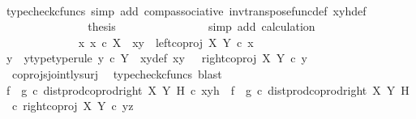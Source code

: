 \begin{isabellebody}
\ \ \ \ \ \ \ \ \ \ \ \ \ \ \isamarkupfalse%
\ {\isacharparenleft}{\kern0pt}typecheck{\isacharunderscore}{\kern0pt}cfuncs{\isacharcomma}{\kern0pt}\ simp\ add{\isacharcolon}{\kern0pt}\ comp{\isacharunderscore}{\kern0pt}associative{}\ inv{\isacharunderscore}{\kern0pt}transpose{\isacharunderscore}{\kern0pt}func{\isacharunderscore}{\kern0pt}def{}\ xyh{\isacharunderscore}{\kern0pt}def{\isacharparenright}{\kern0pt}\isanewline
\ \ \ \ \ \ \ \ \ \ \ \ \isamarkupfalse%
\ \isamarkupfalse%
\ {\isacharquery}{\kern0pt}thesis\isanewline
\ \ \ \ \ \ \ \ \ \ \ \ \ \ \isamarkupfalse%
\ {\isacharparenleft}{\kern0pt}simp\ add{\isacharcolon}{\kern0pt}\ calculation{\isacharparenright}{\kern0pt}\isanewline
\ \ \ \ \ \ \ \ \ \ \isamarkupfalse%
\isanewline
\ \ \ \ \ \ \ \ \ \ \ \ \isamarkupfalse%
\ {\isachardoublequoteopen}{\isasymnexists}x{\isachardot}{\kern0pt}\ x\ {\isasymin}\isactrlsub c\ X\ {\isasymand}\ xy\ {\isacharequal}{\kern0pt}\ left{\isacharunderscore}{\kern0pt}coproj\ X\ Y\ {\isasymcirc}\isactrlsub c\ x{\isachardoublequoteclose}\isanewline
\ \ \ \ \ \ \ \ \ \ \ \ \isamarkupfalse%
\ \isamarkupfalse%
\ y\ \ y{\isacharunderscore}{\kern0pt}type{\isacharbrackleft}{\kern0pt}type{\isacharunderscore}{\kern0pt}rule{\isacharbrackright}{\kern0pt}{\isacharcolon}{\kern0pt}\ {\isachardoublequoteopen}y\ {\isasymin}\isactrlsub c\ Y{\isachardoublequoteclose}\ \ xy{\isacharunderscore}{\kern0pt}def{\isacharcolon}{\kern0pt}\ {\isachardoublequoteopen}xy\ {\isacharequal}{\kern0pt}\ \ right{\isacharunderscore}{\kern0pt}coproj\ X\ Y\ {\isasymcirc}\isactrlsub c\ y{\isachardoublequoteclose}\isanewline
\ \ \ \ \ \ \ \ \ \ \ \ \ \ \isamarkupfalse%
\ \ coprojs{\isacharunderscore}{\kern0pt}jointly{\isacharunderscore}{\kern0pt}surj\ \isamarkupfalse%
\ {\isacharparenleft}{\kern0pt}typecheck{\isacharunderscore}{\kern0pt}cfuncs{\isacharcomma}{\kern0pt}\ blast{\isacharparenright}{\kern0pt}\isanewline
\ \ \ \ \ \ \ \ \ \ \ \ \isamarkupfalse%
\ {\isachardoublequoteopen}{\isacharparenleft}{\kern0pt}f\isactrlsup {\isasymflat}\ {\isasymamalg}\ g\isactrlsup {\isasymflat}\ {\isasymcirc}\isactrlsub c\ dist{\isacharunderscore}{\kern0pt}prod{\isacharunderscore}{\kern0pt}coprod{\isacharunderscore}{\kern0pt}right\ X\ Y\ H{\isacharparenright}{\kern0pt}\ {\isasymcirc}\isactrlsub c\ xyh\ {\isacharequal}{\kern0pt}\ {\isacharparenleft}{\kern0pt}f\isactrlsup {\isasymflat}\ {\isasymamalg}\ g\isactrlsup {\isasymflat}{\isacharparenright}{\kern0pt}\ {\isasymcirc}\isactrlsub c\ {\isacharparenleft}{\kern0pt}dist{\isacharunderscore}{\kern0pt}prod{\isacharunderscore}{\kern0pt}coprod{\isacharunderscore}{\kern0pt}right\ X\ Y\ H\ \ {\isasymcirc}\isactrlsub c\ {\isasymlangle}right{\isacharunderscore}{\kern0pt}coproj\ X\ Y\ {\isasymcirc}\isactrlsub c\ y{\isacharcomma}{\kern0pt}z{\isasymrangle}{\isacharparenright}{\kern0pt}{\isachardoublequoteclose}\isanewline

\end{isabellebody}
